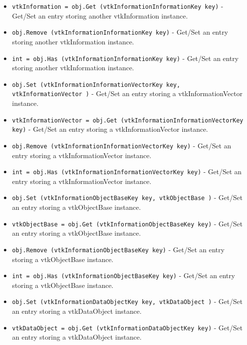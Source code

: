 \begin{itemize}
\item  \verb|vtkInformation = obj.Get (vtkInformationInformationKey key)| -  Get/Set an entry storing another vtkInformation instance.

\item  \verb|obj.Remove (vtkInformationInformationKey key)| -  Get/Set an entry storing another vtkInformation instance.

\item  \verb|int = obj.Has (vtkInformationInformationKey key)| -  Get/Set an entry storing another vtkInformation instance.

\item  \verb|obj.Set (vtkInformationInformationVectorKey key, vtkInformationVector )| -  Get/Set an entry storing a vtkInformationVector instance.

\item  \verb|vtkInformationVector = obj.Get (vtkInformationInformationVectorKey key)| -  Get/Set an entry storing a vtkInformationVector instance.

\item  \verb|obj.Remove (vtkInformationInformationVectorKey key)| -  Get/Set an entry storing a vtkInformationVector instance.

\item  \verb|int = obj.Has (vtkInformationInformationVectorKey key)| -  Get/Set an entry storing a vtkInformationVector instance.

\item  \verb|obj.Set (vtkInformationObjectBaseKey key, vtkObjectBase )| -  Get/Set an entry storing a vtkObjectBase instance.

\item  \verb|vtkObjectBase = obj.Get (vtkInformationObjectBaseKey key)| -  Get/Set an entry storing a vtkObjectBase instance.

\item  \verb|obj.Remove (vtkInformationObjectBaseKey key)| -  Get/Set an entry storing a vtkObjectBase instance.

\item  \verb|int = obj.Has (vtkInformationObjectBaseKey key)| -  Get/Set an entry storing a vtkObjectBase instance.

\item  \verb|obj.Set (vtkInformationDataObjectKey key, vtkDataObject )| -  Get/Set an entry storing a vtkDataObject instance.

\item  \verb|vtkDataObject = obj.Get (vtkInformationDataObjectKey key)| -  Get/Set an entry storing a vtkDataObject instance.


\end{itemize}
